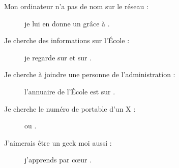\begin{description}
\item[Mon ordinateur n'a pas de nom sur le réseau : ] je lui en donne un gr\^ace \`a  .

\item[Je cherche des informations sur l'\'Ecole : ] je regarde sur  et sur .

\item[Je cherche à joindre une personne de l'administration : ] l'annuaire de l'École est sur \linebreak{} .

\item[Je cherche le numéro de portable d'un X : ] \fkz ou .

\item[J'aimerais être un geek moi aussi : ] j'apprends par c\oe ur .

\end{description}
